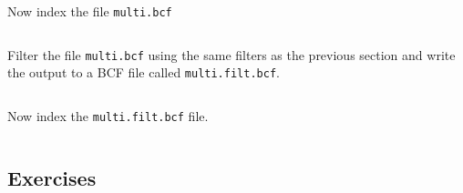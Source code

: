 \documentclass[11pt]{article}
\makeatletter
\newcommand{\boxspacing}{\kern\kvtcb@left@rule\kern\kvtcb@boxsep}
\newcommand{\prompt}[4]{

        {\ttfamily\llap{{\color{blue}\LARGE\faKeyboardO\hspace{3pt}#4}}\vspace{-\baselineskip}}
    }
\makeatother
\begin{document}
    \begin{tcolorbox}[breakable, size=fbox, boxrule=1pt, pad at break*=1mm,colback=cellbackground, colframe=cellborder]
\prompt{In}{incolor}{ }{\boxspacing}
\begin{Verbatim}[commandchars=\\\{\}]

\end{Verbatim}
\end{tcolorbox}

    Now index the file \texttt{multi.bcf}

    \begin{tcolorbox}[breakable, size=fbox, boxrule=1pt, pad at break*=1mm,colback=cellbackground, colframe=cellborder]
\prompt{In}{incolor}{ }{\boxspacing}
\begin{Verbatim}[commandchars=\\\{\}]

\end{Verbatim}
\end{tcolorbox}

    Filter the file \texttt{multi.bcf} using the same filters as the
previous section and write the output to a BCF file called
\texttt{multi.filt.bcf}.

    \begin{tcolorbox}[breakable, size=fbox, boxrule=1pt, pad at break*=1mm,colback=cellbackground, colframe=cellborder]
\prompt{In}{incolor}{ }{\boxspacing}
\begin{Verbatim}[commandchars=\\\{\}]

\end{Verbatim}
\end{tcolorbox}

    Now index the \texttt{multi.filt.bcf} file.

    \begin{tcolorbox}[breakable, size=fbox, boxrule=1pt, pad at break*=1mm,colback=cellbackground, colframe=cellborder]
\prompt{In}{incolor}{ }{\boxspacing}
\begin{Verbatim}[commandchars=\\\{\}]

\end{Verbatim}
\end{tcolorbox}

    \hypertarget{exercises}{%
\subsection{Exercises}\label{exercises}}
\end{document}
